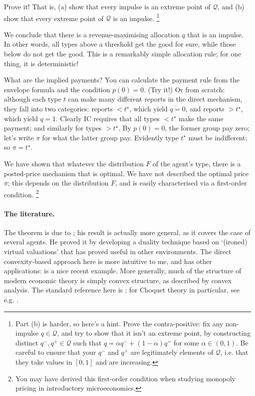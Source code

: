 \begin{exercise}
	\label{exercise:incr_ext_pnts}
	Prove it! That is,
	(a) show that every impulse is an extreme point of $\mathcal{Q}$, and
	(b) show that every extreme point of $\mathcal{Q}$ is an impulse.%
		\footnote{Part (b) is harder, so here's a hint.
		Prove the contra-positive: fix any non-impulse $q \in \mathcal{Q}$, and try to show that it isn't an extreme point, by constructing distinct $q^-,q^+ \in \mathcal{Q}$ such that $q = \alpha q^- + (1-\alpha) q^+$ for some $\alpha \in (0,1)$.
		Be careful to ensure that your $q^-$ and $q^+$ are legitimately elements of $\mathcal{Q}$, i.e. that they take values in $[0,1]$ and are increasing.}
\end{exercise}


We conclude that there is a revenue-maximising allocation $q$
that is an impulse.
In other words, all types above a threshold get the good for sure,
while those below do not get the good.
This is a remarkably simple allocation rule; for one thing, it is deterministic!

What are the implied payments? You can calculate the payment rule from the envelope formula and the condition $p(0)=0$. (Try it!)
Or from scratch: although each type $t$ can make many different reports in the direct mechanism, they fall into two categories: reports $< t^\star$, which yield $q=0$,
and reports $>t^\star$, which yield $q=1$.
Clearly IC requires that all types $<t^\star$ make the same payment;
and similarly for types $>t^\star$.
By $p(0)=0$, the former group pay zero;
let's write $\pi$ for what the latter group pay.
Evidently type $t^\star$ must be indifferent; so $\pi = t^\star$.

We have shown that whatever the distribution $F$ of the agent's type,
there is a posted-price mechanism that is optimal.
We have not described the optimal price $\pi$; this depends on the distribution $F$, and is easily characterised via a first-order condition.%
	\footnote{You may have derived this first-order condition when studying monopoly pricing in introductory microeconomics.}


\paragraph{The literature.}
The theorem is due to \textcite{Myerson1981}; his result is actually more general, as it covers the case of several agents.
He proved it by developing a duality technique based on `(ironed) virtual valuations' that has proved useful in other environments.
The direct convexity-based approach here is more intuitive to me,
and has other applications: \textcite{KleinerMoldovanuStrack2021} is a nice recent example.
More generally, much of the structure of modern economic theory is simply convex structure, as described by convex analysis. The standard reference here is \textcite{Rockafellar1970}; for Choquet theory in particular, see e.g. \textcite{Phelps2001}.


